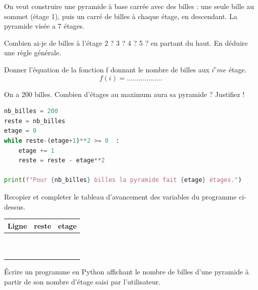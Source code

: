 \newpage
\begin{Exercise}[title={Pyramide}]

On veut construire une pyramide à base carrée avec des billes : une seule bille au sommet (étage 1), puis un carré de billes à chaque étage, en descendant. La pyramide visée a 7 étages.
\begin{center}
        
\end{center}
\Question Combien ai-je de billes à l'étage 2 ? 3 ? 4 ? 5 ? en partant du haut. En déduire une règle générale.\\
\emptybox{2cm}

\Question Donner l'équation de la fonction f donnant le nombre de billes aux $i^eme$ étage.
$$f(i)=..................$$

\Question On a 200 billes. Combien d'étages au maximum aura sa pyramide ? Justifiez !\\
\emptybox{2cm}



\begin{lstlisting}[style=pythonstyle, language=python]
nb_billes = 200
reste = nb_billes
etage = 0
while reste-(etage+1)**2 >= 0  :
    etage += 1
    reste = reste - etage**2

print(f"Pour {nb_billes} billes la pyramide fait {etage} étages.")
\end{lstlisting}
\Question Recopier et completer le tableau d'avancement des variables du programme ci-dessus.

\begin{center}
\large
\begin{tabular}{c|c|c|}
\textbf{Ligne} & \textbf{reste} & \textbf{etage}  \\
\hline
 &  & \\
 &  & \\
 &  & \\
 &  & \\
 &  & \\
 &  & \\
 &  & \\
 &  & \\
 &  & \\
 &  & \\
\end{tabular}
\end{center}

\Question Écrire un programme en Python affichant le nombre de billes d'une pyramide à partir de son nombre d'étage saisi par l'utilisateur. 



\end{Exercise}